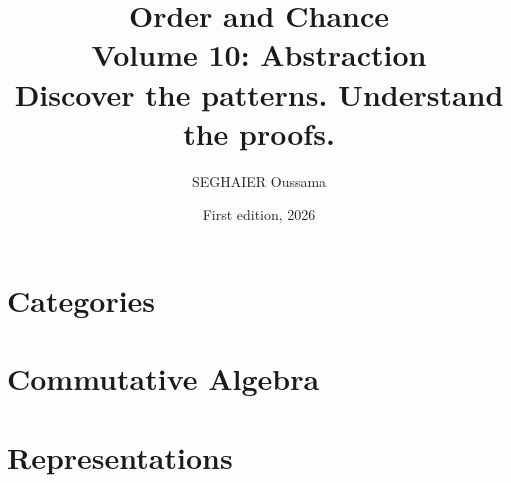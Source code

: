 \documentclass[11pt,openany]{book}
\title{\Huge\textbf{Order and Chance}\\[0.4em]\LARGE Volume 10: Abstraction\\[0.6em]
\Large Discover the patterns. Understand the proofs.}
\author{SEGHAIER Oussama}
\date{First edition, 2026}
\begin{document}
\frontmatter
\makecover
\maketitle

\tableofcontents

\mainmatter

\part{Categories}


\part{Commutative Algebra}




\part{Representations}





\end{document}
